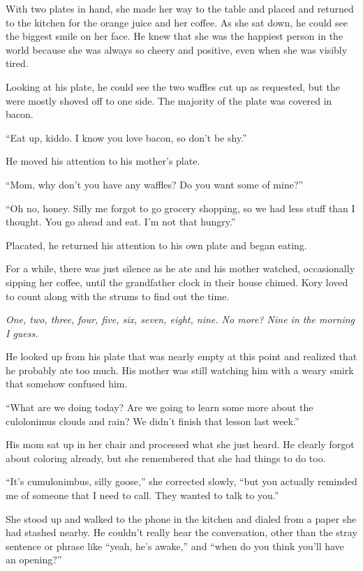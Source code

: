 With two plates in hand, she made her way to the table and placed and returned to the kitchen for the orange juice and her coffee. As she sat down, he could see the biggest smile on her face. He knew that she was the happiest person in the world because she was always so cheery and positive, even when she was visibly tired.

Looking at his plate, he could see the two waffles cut up as requested, but the were mostly shoved off to one side. The majority of the plate was covered in bacon.

``Eat up, kiddo. I know you love bacon, so don't be shy.''

He moved his attention to his mother's plate.

``Mom, why don't you have any waffles? Do you want some of mine?''

``Oh no, honey. Silly me forgot to go grocery shopping, so we had less stuff than I thought. You go ahead and eat. I'm not that hungry.''

Placated, he returned his attention to his own plate and began eating.

For a while, there was just silence as he ate and his mother watched, occasionally sipping her coffee, until the grandfather clock in their house chimed. Kory loved to count along with the strums to find out the time.

\textit{One, two, three, four, five, six, seven, eight, nine. No more? Nine in the morning I guess.}

He looked up from his plate that was nearly empty at this point and realized that he probably ate too much. His mother was still watching him with a weary smirk that somehow confused him.

``What are we doing today? Are we going to learn some more about the culolonimus clouds and rain? We didn't finish that lesson last week.''

His mom sat up in her chair and processed what she just heard. He clearly forgot about coloring already, but she remembered that she had things to do too.

``It's cumulonimbus, silly goose,'' she corrected slowly, ``but you actually reminded me of someone that I need to call. They wanted to talk to you.''

She stood up and walked to the phone in the kitchen and dialed from a paper she had stashed nearby. He couldn't really hear the conversation, other than the stray sentence or phrase like ``yeah, he's awake,'' and ``when do you think you'll have an opening?''

